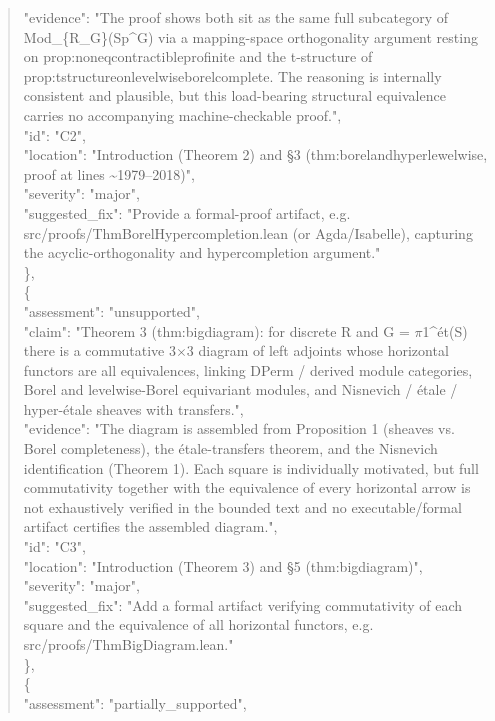 \documentclass[11pt]{article}
\begin{document}
\begin{quote}
      "evidence": "The proof shows both sit as the same full subcategory of Mod\_\{R\_G\}(Sp\^{}G) via a mapping-space orthogonality argument resting on prop:noneqcontractibleprofinite and the t-structure of prop:tstructureonlevelwiseborelcomplete. The reasoning is internally consistent and plausible, but this load-bearing structural equivalence carries no accompanying machine-checkable proof.",\\
      "id": "C2",\\
      "location": "Introduction (Theorem 2) and §3 (thm:borelandhyperlewelwise, proof at lines \~{}1979--2018)",\\
      "severity": "major",\\
      "suggested\_fix": "Provide a formal-proof artifact, e.g. src/proofs/ThmBorelHypercompletion.lean (or Agda/Isabelle), capturing the acyclic-orthogonality and hypercompletion argument."\\
    \},\\
    \{\\
      "assessment": "unsupported",\\
      "claim": "Theorem 3 (thm:bigdiagram): for discrete R and G = \ensuremath{\pi}1\^{}ét(S) there is a commutative 3\ensuremath{\times}3 diagram of left adjoints whose horizontal functors are all equivalences, linking DPerm / derived module categories, Borel and levelwise-Borel equivariant modules, and Nisnevich / étale / hyper-étale sheaves with transfers.",\\
      "evidence": "The diagram is assembled from Proposition 1 (sheaves vs. Borel completeness), the étale-transfers theorem, and the Nisnevich identification (Theorem 1). Each square is individually motivated, but full commutativity together with the equivalence of every horizontal arrow is not exhaustively verified in the bounded text and no executable/formal artifact certifies the assembled diagram.",\\
      "id": "C3",\\
      "location": "Introduction (Theorem 3) and §5 (thm:bigdiagram)",\\
      "severity": "major",\\
      "suggested\_fix": "Add a formal artifact verifying commutativity of each square and the equivalence of all horizontal functors, e.g. src/proofs/ThmBigDiagram.lean."\\
    \},\\
    \{\\
      "assessment": "partially\_supported",\\

\end{quote}
\end{document}
